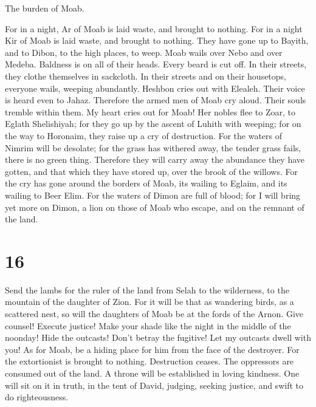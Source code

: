  The burden of Moab.

For in a night, Ar of Moab is laid waste, and brought to nothing. For in
a night Kir of Moab is laid waste, and brought to nothing. 
They have gone up to Bayith, and to Dibon, to the high places, to weep.
Moab wails over Nebo and over Medeba. Baldness is on all of their heads.
Every beard is cut off.  In their streets, they clothe
themselves in sackcloth. In their streets and on their housetops,
everyone wails, weeping abundantly.  Heshbon cries out with
Elealeh. Their voice is heard even to Jahaz. Therefore the armed men of
Moab cry aloud. Their souls tremble within them.  My heart
cries out for Moab! Her nobles flee to Zoar, to Eglath Shelishiyah; for
they go up by the ascent of Luhith with weeping; for on the way to
Horonaim, they raise up a cry of destruction.  For the
waters of Nimrim will be desolate; for the grass has withered away, the
tender grass fails, there is no green thing.  Therefore they
will carry away the abundance they have gotten, and that which they have
stored up, over the brook of the willows.  For the cry has
gone around the borders of Moab, its wailing to Eglaim, and its wailing
to Beer Elim.  For the waters of Dimon are full of blood;
for I will bring yet more on Dimon, a lion on those of Moab who escape,
and on the remnant of the land.

\hypertarget{section-15}{%
\section{16}\label{section-15}}

 Send the lambs for the ruler of the land from Selah to the
wilderness, to the mountain of the daughter of Zion.  For it
will be that as wandering birds, as a scattered nest, so will the
daughters of Moab be at the fords of the Arnon.  Give
counsel! Execute justice! Make your shade like the night in the middle
of the noonday! Hide the outcasts! Don't betray the fugitive!
 Let my outcasts dwell with you! As for Moab, be a hiding
place for him from the face of the destroyer. For the extortionist is
brought to nothing. Destruction ceases. The oppressors are consumed out
of the land.  A throne will be established in loving
kindness. One will sit on it in truth, in the tent of David, judging,
seeking justice, and swift to do righteousness.


